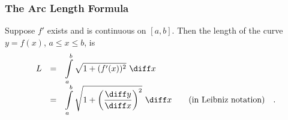 \begin{frame}
\frametitle{The Arc Length Formula}

\begin{definition}
Suppose $f'$ exists and is continuous on $[a,b]$. Then the length of the curve $y = f(x)$, $a\leq x \leq b$, is
\[
\begin{array}{rclll}
\displaystyle L& =&\displaystyle  \int\limits_a^b \sqrt{1 +(f'(x))^2} \ \diff x\\
 &=&\displaystyle  \int\limits_a^b \sqrt{1 + \left( \frac{\diff y}{\diff x}\right)^2} \ \diff x&&\text{(in Leibniz notation)\quad .}
\end{array}
\]
\end{definition}

\end{frame}
